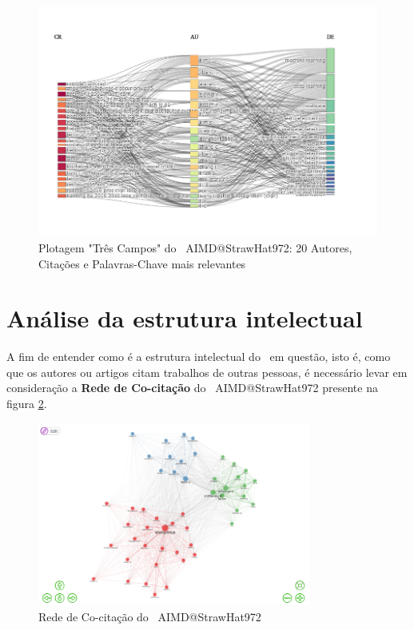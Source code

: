 \begin{figure}[H]
    \centering
    \includegraphics[width=1\textwidth]{experiments/StrawHat972/PesqBibliogr/IA-DeteccaoMalware/WoS-20220209/Imagens/AIMDThreeFieldPlot.png}
    \caption{Plotagem "Três Campos" do \dataset\ AIMD@StrawHat972: 20 Autores, Citações e Palavras-Chave mais relevantes}
    \label{fig:StrawHat972:ThreeFieldPlot}
\end{figure}

\section{Análise da estrutura intelectual}

A fim de entender como é a estrutura intelectual do \dataset\ em questão, isto é, como que os autores ou artigos citam trabalhos de outras pessoas, é necessário levar em consideração a \textbf{Rede de Co-citação} do \dataset\ AIMD@StrawHat972 presente na figura \ref{fig:StrawHat972:CocitationNet}.

\begin{figure}[H]
    \centering
    \includegraphics[width=0.8\textwidth]{experiments/StrawHat972/PesqBibliogr/IA-DeteccaoMalware/WoS-20220209/Imagens/AIMDCocitationNetwork.png}
    \caption{Rede de Co-citação do \dataset\ AIMD@StrawHat972}
    \label{fig:StrawHat972:CocitationNet}
\end{figure}

